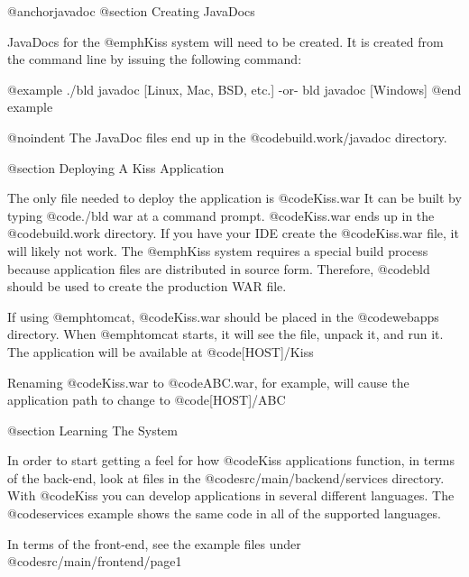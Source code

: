 @anchor{javadoc} @section Creating JavaDocs

JavaDocs for the @emph{Kiss} system will need to be created.  It is
created from the command line by issuing the following command:

@example
./bld javadoc              [Linux, Mac, BSD, etc.]
    -or-
bld javadoc                [Windows]
@end example

@noindent
The JavaDoc files end up in the @code{build.work/javadoc} directory.


@section Deploying A Kiss Application

The only file needed to deploy the application is @code{Kiss.war} It
can be built by typing @code{./bld war} at a command prompt.
@code{Kiss.war} ends up in the @code{build.work} directory.  If you
have your IDE create the @code{Kiss.war} file, it will likely not
work.  The @emph{Kiss} system requires a special build process because
application files are distributed in source form.  Therefore, @code{bld}
should be used to create the production WAR file.

If using @emph{tomcat}, @code{Kiss.war} should be placed in the
@code{webapps} directory.  When @emph{tomcat} starts, it will see the
file, unpack it, and run it.  The application will be available at
@code{[HOST]/Kiss}

Renaming @code{Kiss.war} to @code{ABC.war}, for example, will cause
the application path to change to @code{[HOST]/ABC}

@section Learning The System

In order to start getting a feel for how @code{Kiss} applications
function, in terms of the back-end, look at files in the
@code{src/main/backend/services} directory.  With @code{Kiss} you can
develop applications in several different languages.  The @code{services}
example shows the same code in all of the supported languages.

In terms of the front-end, see the example files under @code{src/main/frontend/page1}
